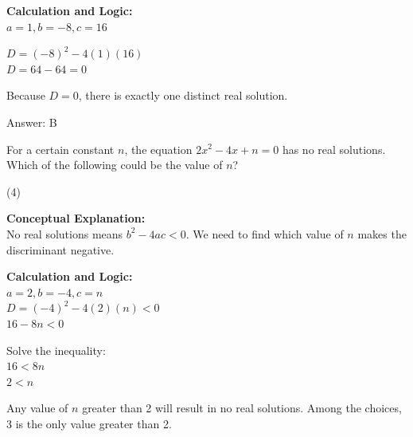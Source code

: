 \documentclass[11pt,paper=a4,answers]{exam}
\begin{document}
\begin{questions}
\begin{solution}
\vspace{20pt}

\textbf{Calculation and Logic:} \\
$a = 1, b = -8, c = 16$

\vspace{10pt}

$D = (-8)^2 - 4(1)(16)$ \\
$D = 64 - 64 = 0$

\vspace{10pt}

Because $D = 0$, there is exactly one distinct real solution.

\vspace{25pt}

Answer: \colorbox{yellow!100}{B}
\end{solution}

\vspace{40pt}

\question
For a certain constant $n$, the equation $2x^2 - 4x + n = 0$ has no real solutions. Which of the following could be the value of $n$?
\begin{tasks}(4)
\end{tasks}

\begin{solution}
\textbf{Conceptual Explanation:} \\
No real solutions means $b^2 - 4ac < 0$. We need to find which value of $n$ makes the discriminant negative.

\vspace{20pt}

\textbf{Calculation and Logic:} \\
$a = 2, b = -4, c = n$ \\
$D = (-4)^2 - 4(2)(n) < 0$ \\
$16 - 8n < 0$

\vspace{10pt}

Solve the inequality: \\
$16 < 8n$ \\
$2 < n$

\vspace{10pt}

Any value of $n$ greater than 2 will result in no real solutions. Among the choices, 3 is the only value greater than 2.

\vspace{25pt}


\end{solution}
\end{questions}
\end{document}
